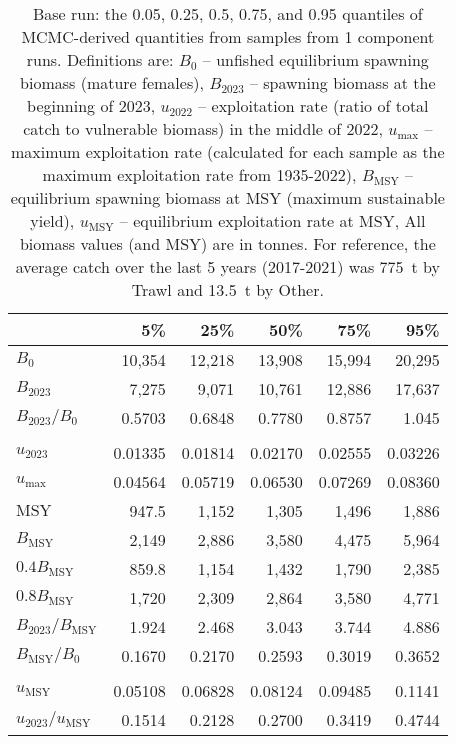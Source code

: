 \documentclass[11pt]{book}
\begin{document}
\setlength{\tabcolsep}{6pt}
\begin{table}[ht]
\centering
\caption{Base run: the 0.05, 0.25, 0.5, 0.75, and 0.95 quantiles of MCMC-derived quantities from \Nbase samples  from 1 component runs. Definitions are: $B_0$ -- unfished equilibrium spawning biomass (mature females), $B_{2023}$ -- spawning biomass at the beginning of 2023, $u_{2022}$ -- exploitation rate (ratio of total catch to vulnerable biomass) in the middle of 2022, $u_\text{max}$ -- maximum exploitation rate (calculated for each sample as the maximum exploitation rate from 1935-2022), $B_\text{MSY}$ -- equilibrium spawning biomass at MSY (maximum sustainable yield), $u_\text{MSY}$ -- equilibrium exploitation rate at MSY, All biomass values (and MSY) are in tonnes. For reference, the average catch over the last 5 years (2017-2021) was 775~t by Trawl and 13.5~t by Other.} 
\label{tab:car.base.rfpt}
\begin{tabular}{lrrrrr}
  \\[-1.0ex] \hline
 & 5\% & 25\% & 50\% & 75\% & 95\% \\ 
  \hline
$B_{0}$ & 10,354 & 12,218 & 13,908 & 15,994 & 20,295 \\ 
  $B_{2023}$ & 7,275 & 9,071 & 10,761 & 12,886 & 17,637 \\ 
  $B_{2023}/B_{0}$ & 0.5703 & 0.6848 & 0.7780 & 0.8757 & 1.045 \\ 
   \hdashline \\[-1.75ex]$u_{2023}$ & 0.01335 & 0.01814 & 0.02170 & 0.02555 & 0.03226 \\ 
  $u_\text{max}$ & 0.04564 & 0.05719 & 0.06530 & 0.07269 & 0.08360 \\ 
   \hline
$\text{MSY}$ & 947.5 & 1,152 & 1,305 & 1,496 & 1,886 \\ 
  $B_\text{MSY}$ & 2,149 & 2,886 & 3,580 & 4,475 & 5,964 \\ 
  $0.4B_{\text{MSY}}$ & 859.8 & 1,154 & 1,432 & 1,790 & 2,385 \\ 
  $0.8B_{\text{MSY}}$ & 1,720 & 2,309 & 2,864 & 3,580 & 4,771 \\ 
  $B_{2023}/B_\text{MSY}$ & 1.924 & 2.468 & 3.043 & 3.744 & 4.886 \\ 
  $B_\text{MSY}/B_{0}$ & 0.1670 & 0.2170 & 0.2593 & 0.3019 & 0.3652 \\ 
   \hdashline \\[-1.75ex]$u_\text{MSY}$ & 0.05108 & 0.06828 & 0.08124 & 0.09485 & 0.1141 \\ 
  $u_{2023}/u_\text{MSY}$ & 0.1514 & 0.2128 & 0.2700 & 0.3419 & 0.4744 \\ 
   \hline
\end{tabular}
\end{table}
\setlength{\tabcolsep}{2pt}


\end{document}
